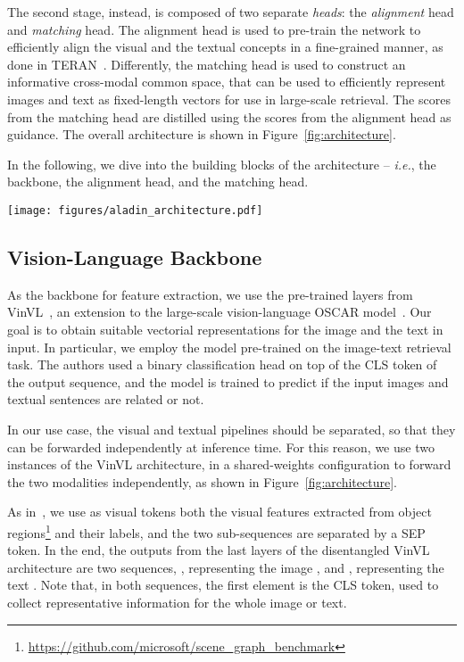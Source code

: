 \documentclass[sigconf]{acmart}
\def \ie {\emph{i.e.}}
\begin{document}
The second stage, instead, is composed of two separate \textit{heads}: the \textit{alignment} head and \textit{matching} head. The alignment head is used to pre-train the network to efficiently align the visual and the textual concepts in a fine-grained manner, as done in TERAN~\citep{messina2021fine}. Differently, the matching head is used to construct an informative cross-modal common space, that can be used to efficiently represent images and text as fixed-length vectors for use in large-scale retrieval. The scores from the matching head are distilled using the scores from the alignment head as guidance. The overall architecture is shown in Figure~\ref{fig:architecture}.

In the following, we dive into the building blocks of the architecture -- \ie, the backbone, the alignment head, and the matching head.

\begin{figure*}[t]
  \centering
  \texttt{[image: figures/aladin\_architecture.pdf]}
  \caption{Overview of our architecture. The backbone extracts visual and textual features that are used in both the matching and alignment heads. The matching head is trained by distilling the scores using the ones coming from the alignment head.}
  \label{fig:architecture}
\end{figure*}

\subsection{Vision-Language Backbone}
As the backbone for feature extraction, we use the pre-trained layers from VinVL~\citep{zhang2021vinvl}, an extension to the large-scale vision-language OSCAR model~\citep{li2020oscar}.
Our goal is to obtain suitable vectorial representations for the image  and the text  in input. In particular, we employ the model pre-trained on the image-text retrieval task. The authors used a binary classification head on top of the CLS token of the output sequence, and the model is trained to predict if the input images and textual sentences are related or not.

In our use case, the visual and textual pipelines should be separated, so that they can be forwarded independently at inference time.
For this reason, we use two instances of the VinVL architecture, in a shared-weights configuration to forward the two modalities independently, as shown in Figure~\ref{fig:architecture}. 

As in~\citep{zhang2021vinvl}, we use as visual tokens both the visual features extracted from object regions\footnote{\url{https://github.com/microsoft/scene\_graph\_benchmark}} and their labels, and the two sub-sequences are separated by a SEP token.
In the end, the outputs from the last layers of the disentangled VinVL architecture are two sequences, , representing the image , and , representing the text .
Note that, in both sequences, the first element is the CLS token, used to collect representative information for the whole image or text.
\end{document}
